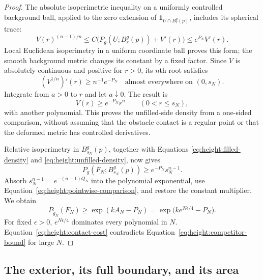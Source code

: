\begin{proof}
The absolute isoperimetric inequality on a uniformly controlled
background ball, applied to the zero extension of
$\mathbf1_{U\cap B^g_r(p)}$, includes its spherical trace:
\[
 V(r)^{(n-1)/n}
 \le C\bigl(P_g(U;B^g_r(p))+V'(r)\bigr)
 \le e^{P_N}V'(r).
\]
Local Euclidean isoperimetry in a uniform coordinate ball proves this
form; the smooth background metric changes its constant by a fixed
factor.  Since $V$ is absolutely continuous and positive for $r>0$,
its $n$th root satisfies
\[
 (V^{1/n})'(r)\ge n^{-1}e^{-P_N}
 \quad\text{almost everywhere on }(0,s_N).
\]
Integrate from $a>0$ to $r$ and let $a\downarrow0$.  The result is
\begin{equation}\label{eq:height:unfilled-density}
 V(r)\ge e^{-P_N}r^n\qquad(0<r\le s_N),
\end{equation}
with another polynomial.  This proves the unfilled-side density from
a one-sided comparison, without assuming that the obstacle contact is
a regular point or that the deformed metric has controlled derivatives.

Relative isoperimetry in $B^g_{s_N}(p)$, together with Equations
\eqref{eq:height:filled-density} and \eqref{eq:height:unfilled-density},
now gives
\[
 P_g(F_N;B^g_{s_N}(p))\ge e^{-P_N}s_N^{n-1}.
\]
Absorb $s_N^{n-1}=e^{-(n-1)Q_N}$ into the polynomial exponential,
use Equation~\eqref{eq:height:pointwise-comparison}, and restore the
constant multiplier.  We obtain
\begin{equation}\label{eq:height:contact-cost}
 P_{\widetilde g_N}(F_N)
 \ge\exp(kA_N-P_N)
 =\exp\bigl(k e^{N\epsilon/4}-P_N\bigr).
\end{equation}
For fixed $\epsilon>0$, $e^{N\epsilon/4}$ dominates every polynomial
in $N$.  Equation~\eqref{eq:height:contact-cost} contradicts
Equation~\eqref{eq:height:competitor-bound} for large $N$.
\end{proof}



\subsection{The exterior, its full boundary, and its area}

